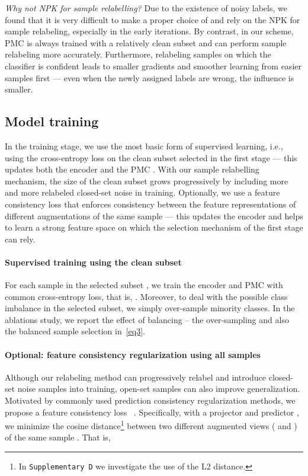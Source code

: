 \documentclass{bmvc2k}
\begin{document}
\textit{Why not NPK  for sample relabelling?}
\quad Due to the existence of noisy labels, we found that it is very difficult to make a proper choice of  and rely on the NPK  for sample relabeling, especially in the early iterations. By contrast, in our scheme, PMC  is always trained with a relatively clean subset and can perform sample relabeling more accurately. Furthermore, relabeling samples on which the classifier is confident leads to smaller gradients and smoother learning from easier samples first --- even when the newly assigned labels are wrong, the influence is smaller.





\subsection{Model training}
\label{3_4}
In the training stage, we use the most basic form of supervised learning, i.e., using the cross-entropy loss on the clean subset selected in the first stage --- this updates both the encoder  and the PMC . With our sample relabelling mechanism, the size of the clean subset grows progressively by including more and more relabeled closed-set noise in training. Optionally, we use a feature consistency loss that enforces consistency between the feature representations of different augmentations of the same sample --- this updates the encoder  and helps to learn a strong feature space on which the selection mechanism of the first stage can rely. 

\paragraph{Supervised training using the clean subset}
For each sample  in the selected subset , we train the encoder  and PMC  with common cross-entropy loss, that is, .
Moreover, to deal with the possible class imbalance in the selected subset, we simply over-sample minority classes. In the ablations study, we report the effect of balancing -- the over-sampling and also the balanced sample selection in~\cref{eq3}.
\paragraph{Optional: feature consistency regularization using all samples} 
Although our relabeling method can progressively relabel and introduce closed-set noise samples into training, open-set samples can also improve generalization. Motivated by commonly used prediction consistency regularization methods, we propose a feature consistency loss ~\citep{simsiam}. Specifically, with a projector  and predictor , we minimize the cosine distance\footnote{In \texttt{Supplementary D} we investigate the use of the L2 distance.} between two different augmented views ( and ) of the same sample . That is,
\end{document}
